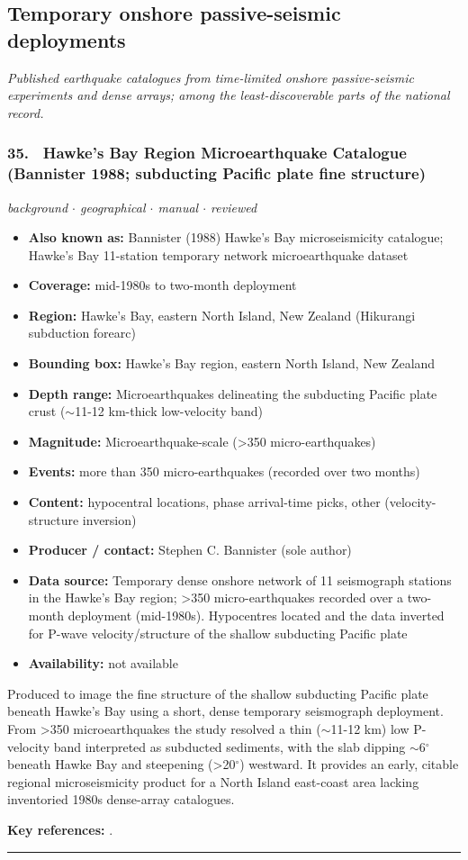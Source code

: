 \documentclass[10pt,a4paper]{article}
\newcommand{\catentryrule}{\par\vspace{3pt}\noindent\textcolor{rulegrey}{\rule{\linewidth}{0.3pt}}\par\vspace{5pt}}
\newcommand{\kv}[2]{\item \textbf{#1:} #2}
\begin{document}
\subsection{Temporary onshore passive-seismic deployments}
\textit{Published earthquake catalogues from time-limited onshore passive-seismic experiments and dense arrays; among the least-discoverable parts of the national record.}\par\vspace{4pt}
\subsubsection*{\hypertarget{c:35}{35.}~ Hawke's Bay Region Microearthquake Catalogue (Bannister 1988; subducting Pacific plate fine structure)}
{\small\itshape background $\cdot$ geographical $\cdot$ manual $\cdot$ reviewed}\par\vspace{2pt}
\begin{itemize}[leftmargin=1.3em,itemsep=0.6pt,topsep=1pt,parsep=0pt]
\kv{Also known as}{Bannister (1988) Hawke's Bay microseismicity catalogue; Hawke's Bay 11-station temporary network microearthquake dataset}
\kv{Coverage}{mid-1980s to two-month deployment}
\kv{Region}{Hawke's Bay, eastern North Island, New Zealand (Hikurangi subduction forearc)}
\kv{Bounding box}{Hawke's Bay region, eastern North Island, New Zealand}
\kv{Depth range}{Microearthquakes delineating the subducting Pacific plate crust ($\sim$11-12 km-thick low-velocity band)}
\kv{Magnitude}{Microearthquake-scale (\textgreater{}350 micro-earthquakes)}
\kv{Events}{more than 350 micro-earthquakes (recorded over two months)}
\kv{Content}{hypocentral locations, phase arrival-time picks, other (velocity-structure inversion)}
\kv{Producer / contact}{Stephen C. Bannister (sole author)}
\kv{Data source}{Temporary dense onshore network of 11 seismograph stations in the Hawke's Bay region; \textgreater{}350 micro-earthquakes recorded over a two-month deployment (mid-1980s). Hypocentres located and the data inverted for P-wave velocity/structure of the shallow subducting Pacific plate}
\kv{Availability}{not available}
\end{itemize}
\par\vspace{2pt}Produced to image the fine structure of the shallow subducting Pacific plate beneath Hawke's Bay using a short, dense temporary seismograph deployment. From \textgreater{}350 microearthquakes the study resolved a thin ($\sim$11-12 km) low P-velocity band interpreted as subducted sediments, with the slab dipping $\sim$6$^{\circ}$ beneath Hawke Bay and steepening (\textgreater{}20$^{\circ}$) westward. It provides an early, citable regional microseismicity product for a North Island east-coast area lacking inventoried 1980s dense-array catalogues.
\par\vspace{2pt}\textbf{Key references:} \cite{Bannister1988}.
\catentryrule
\end{document}
